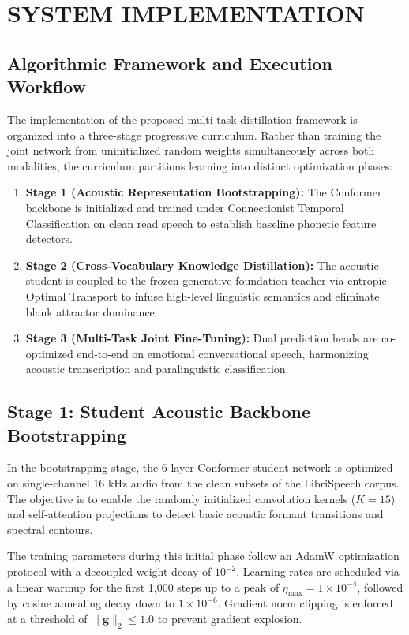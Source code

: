 \chapter{SYSTEM IMPLEMENTATION}
\label{ch:system_implementation}

\section{Algorithmic Framework and Execution Workflow}
The implementation of the proposed multi-task distillation framework is organized into a three-stage progressive curriculum. Rather than training the joint network from uninitialized random weights simultaneously across both modalities, the curriculum partitions learning into distinct optimization phases:
\begin{enumerate}
    \item \textbf{Stage 1 (Acoustic Representation Bootstrapping):} The Conformer backbone is initialized and trained under Connectionist Temporal Classification on clean read speech to establish baseline phonetic feature detectors.
    \item \textbf{Stage 2 (Cross-Vocabulary Knowledge Distillation):} The acoustic student is coupled to the frozen generative foundation teacher via entropic Optimal Transport to infuse high-level linguistic semantics and eliminate blank attractor dominance.
    \item \textbf{Stage 3 (Multi-Task Joint Fine-Tuning):} Dual prediction heads are co-optimized end-to-end on emotional conversational speech, harmonizing acoustic transcription and paralinguistic classification.
\end{enumerate}

\section{Stage 1: Student Acoustic Backbone Bootstrapping}
In the bootstrapping stage, the 6-layer Conformer student network is optimized on single-channel 16 kHz audio from the clean subsets of the LibriSpeech corpus. The objective is to enable the randomly initialized convolution kernels ($K = 15$) and self-attention projections to detect basic acoustic formant transitions and spectral contours.

The training parameters during this initial phase follow an AdamW optimization protocol with a decoupled weight decay of $10^{-2}$. Learning rates are scheduled via a linear warmup for the first 1,000 steps up to a peak of $\eta_{\text{max}} = 1 \times 10^{-4}$, followed by cosine annealing decay down to $1 \times 10^{-6}$. Gradient norm clipping is enforced at a threshold of $\|\mathbf{g}\|_2 \le 1.0$ to prevent gradient explosion.


